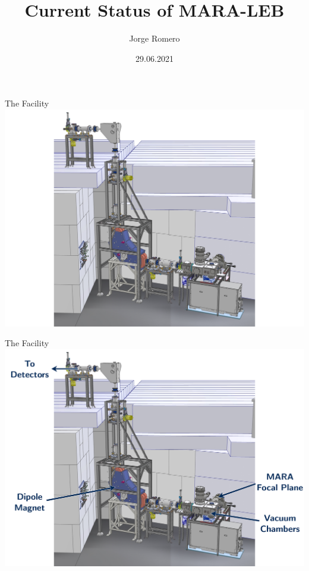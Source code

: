 \documentclass{beamer}
\title{Current Status of MARA-LEB}
\date{29.06.2021}
\author[auth]{Jorge Romero}
\begin{document}
\begin{frame}
\titlepage
\end{frame}
\begin{frame}{The Facility}
    \vspace*{3em}
    \centering
    \includegraphics[scale=0.2]{MARA-LEB.pdf}
\end{frame}
\begin{frame}{The Facility}
    \vspace*{3em}
    \centering
    \includegraphics[scale=0.2]{MARA-LEB2.pdf}
\end{frame}
\end{document}
